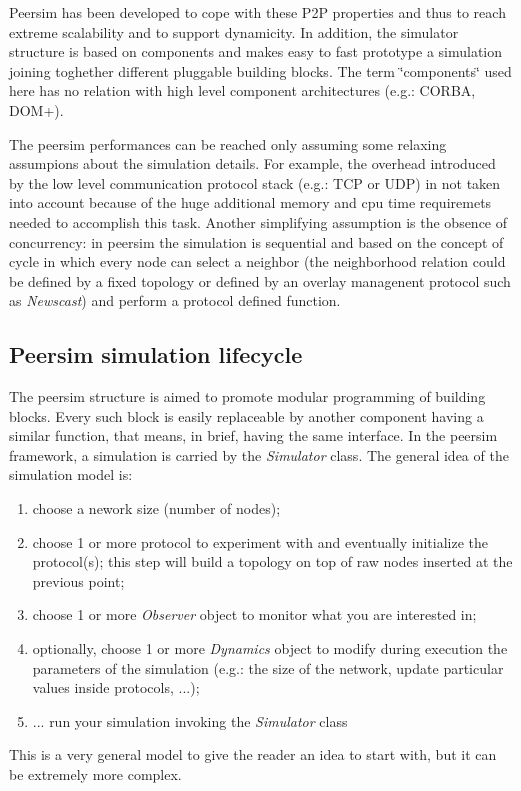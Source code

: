 \documentclass[a4paper,11pt]{article}
\begin{document}
Peersim has been developed to cope with these P2P properties and thus
to reach extreme scalability and to support dynamicity. In addition,
the simulator structure is based on components and makes easy to fast
prototype a simulation joining toghether different pluggable building
blocks. The term \char`\"{}components\char`\"{} used here has no relation
with high level component architectures (e.g.: CORBA, DOM+).

The peersim performances can be reached only assuming some relaxing
assumpions about the simulation details. For example, the overhead
introduced by the low level communication protocol stack (e.g.: TCP
or UDP) in not taken into account because of the huge additional memory
and cpu time requiremets needed to accomplish this task. Another simplifying
assumption is the obsence of concurrency: in peersim the simulation
is sequential and based on the concept of cycle in which every node
can select a neighbor (the neighborhood relation could be defined
by a fixed topology or defined by an overlay managenent protocol such
as \emph{Newscast}) and perform a protocol defined function.


\subsection{Peersim simulation lifecycle}

The peersim structure is aimed to promote modular programming of building
blocks. Every such block is easily replaceable by another component
having a similar function, that means, in brief, having the same interface.
In the peersim framework, a simulation is carried by the \emph{Simulator}
class. The general idea of the simulation model is: 

\begin{enumerate}
\item choose a nework size (number of nodes); 
\item choose 1 or more protocol to experiment with and eventually initialize
the protocol(s); this step will build a topology on top of raw nodes
inserted at the previous point;
\item choose 1 or more \emph{Observer} object to monitor what you are interested
in; 
\item optionally, choose 1 or more \emph{Dynamics} object to modify during
execution the parameters of the simulation (e.g.: the size of the
network, update particular values inside protocols, ...); 
\item ... run your simulation invoking the \emph{Simulator} class
\end{enumerate}
This is a very general model to give the reader an idea to start with,
but it can be extremely more complex. 
\end{document}
